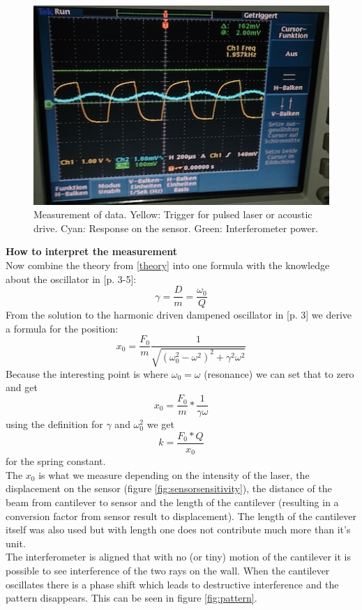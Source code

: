 \documentclass[12pt,a4paper]{article}
\begin{document}
\begin{multicols}{2}
\begin{figure}[H]
	\centering
	\includegraphics[scale=0.5]{../figures/messung.png}
	\caption{Measurement of data. Yellow:  Trigger for pulsed laser or acoustic drive. Cyan: Response on the sensor. Green: Interferometer power.}
	\label{fig:measurement}
\end{figure}

\textbf{How to interpret the measurement}\\
Now combine the theory from \ref{theory} into one formula with the knowledge about the oscillator in \cite{physikwiki}[p. 3-5]:
$$\gamma = \frac{D}{m} = \frac{\omega_0}{Q}$$
From the solution to the harmonic driven dampened oscillator in \cite{physikwiki}[p. 3] we derive a formula for the position:
$$x_0 = \frac{F_0}{m}  \frac{1}{\sqrt{ (\omega_0^2 - \omega^2 )^2 + \gamma^2  \omega^2}}$$
Because the interesting point is where $\omega_0 = \omega$ (resonance) we can set that to zero and get
$$x_0 = \frac{F_0}{m} * \frac{1}{\gamma  \omega}$$
using the definition for $\gamma$ and $\omega_0^2$ we get
$$k = \frac{F_0 * Q}{x_0}$$
for the spring constant.\\
The $x_0$ is what we measure depending on the intensity of the laser, the displacement on the sensor (figure \ref{fig:sensorsensitivity}), the distance of the beam from cantilever to sensor and the length of the cantilever (resulting in a conversion factor from sensor result to displacement). The length of the cantilever itself was also used but with length one does not contribute much more than it's unit.\\

\noindent
The interferometer is aligned that with no (or tiny) motion of the cantilever it is possible to see interference of the two rays on the wall. When the cantilever oscillates there is a phase shift which leads to destructive interference and the pattern disappears. This can be seen in figure \ref{fig:pattern}.


\end{multicols}
\end{document}
